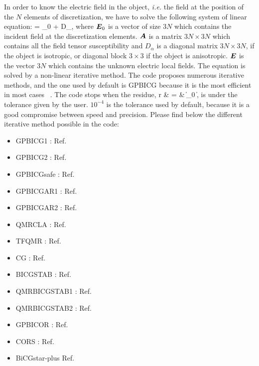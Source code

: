 In order to know the electric field in the object, {\it i.e.} the
field at the position of the $N$ elements of discretization, we have
to solve the following system of linear equation:
\be {} = _0 +  D_\alpha {},\ee
where $\boldsymbol{E}_0$ is a vector of size $3N$ which contains the incident
field at the discretization elements. $\boldsymbol{A}$ is a matrix
$3N\times 3N$ which contains all the field tensor susceptibility and
$D_\alpha$ is a diagonal matrix $3N\times 3N$, if the object is
isotropic, or diagonal block $3\times 3$ if the object is anisotropic.
$\boldsymbol{E}$ is the vector $3N$ which contains the unknown electric local
fields. The equation is solved by a non-linear iterative method. The
code proposes numerous iterative methods, and the one used by default
is GPBICG because it is the most efficient in most cases
~\cite{Chaumet_OL_09}.  The code stops when the residue,
\be r & = &  {
  \|_0 \|}, \ee
is under the tolerance given by the user. $10^{-4}$ is the tolerance
used by default, because it is a good compromise between speed and
precision. Please find below the different iterative method possible
in the code:
\begin{itemize}
\item GPBICG1 : Ref.~
\item GPBICG2 : Ref.~
\item GPBICGsafe : Ref.~
\item GPBICGAR1 : Ref.~
\item GPBICGAR2 : Ref.~
\item QMRCLA : Ref.~
\item TFQMR : Ref.~
\item CG : Ref.~
\item BICGSTAB : Ref.~
\item QMRBICGSTAB1 : Ref.~
\item QMRBICGSTAB2 : Ref.~
\item GPBICOR : Ref.~
\item CORS : Ref.~
\item BiCGstar-plus Ref.~
\end{itemize}
